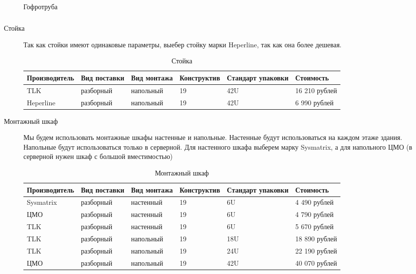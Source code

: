 \begin{description}
\begin{table}[!htp]
\begin{tabular}{|l|l|l|l|l|}
    \end{tabular}
    \caption{Гофротруба}
    \label{table:corrugatedtrube}
  \end{table}
\item[Стойка]
  Так как стойки имеют одинаковые параметры, выебер стойку марки Heperline, так как она более дешевая.
  \begin{table}[!htbp]
    \centering
    \begin{tabular}{|l|l|l|l|l|l|}%
      \hline
      Производитель & Вид поставки & Вид монтажа & Конструктив & Стандарт упаковки & Стоимость \\ \hline
      TLK & разборный & напольный & 19 & 42U & 16 210 рублей \\ \hline
      Heperline & разборный & напольный & 19 & 42U & 6 990 рублей \\ \hline
    \end{tabular}
    \caption{Стойка}
    \label{table:rack}
  \end{table}
\item[Монтажный шкаф]
  Мы будем использовать монтажные шкафы настенные и напольные. Настенные будут использоваться на каждом этаже здания. Напольные будут использоваться только в серверной. Для настенного шкафа выберем марку Sysmatrix, а для напольного ЦМО (в серверной нужен шкаф с большой вместимостью)
  \begin{table}[!htp]
    \centering
    \begin{tabular}{|l|l|l|l|l|l|}%
      \hline
      Производитель & Вид поставки & Вид монтажа & Конструктив & Стандарт упаковки & Стоимость \\ \hline
      Sysmatrix & разборный & настенный & 19 & 6U & 4 490 рублей \\ \hline
      ЦМО & разборный & настенный & 19 & 6U & 4 790 рублей \\ \hline
      TLK & разборный & настенный &19 &6U &5 670 рублей\\ \hline
      TLK & разборный & напольный & 19 & 18U & 18 890 рублей \\ \hline
      TLK & разборный & напольный & 19 & 24U & 22 190 рублей \\ \hline
      ЦМО & разборный & напольный & 19 & 42U & 40 070 рублей \\ \hline
    \end{tabular}
    \caption{Монтажный шкаф}
    \label{table:mounting}
  \end{table}

\end{description}

